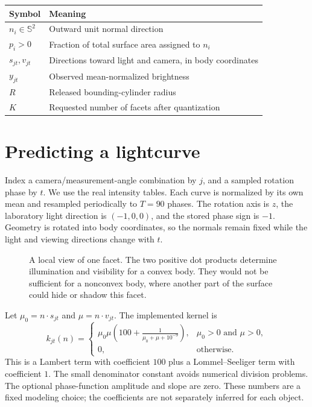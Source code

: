 \documentclass[11pt,a4paper]{article}
\newcommand{\sphere}{\mathbb{S}^{2}}
\begin{document}
\begin{center}
\begin{tabular}{@{}ll@{}}\toprule
Symbol & Meaning \\\midrule
$n_i\in\sphere$ & Outward unit normal direction \\
$p_i>0$ & Fraction of total surface area assigned to $n_i$ \\
$s_{jt},v_{jt}$ & Directions toward light and camera, in body coordinates \\
$y_{jt}$ & Observed mean-normalized brightness \\
$R$ & Released bounding-cylinder radius \\
$K$ & Requested number of facets after quantization \\
\bottomrule\end{tabular}
\end{center}

\clearpage
\section{Predicting a lightcurve}
Index a camera/measurement-angle combination by $j$, and a sampled rotation phase by $t$. We use the real intensity tables. Each curve is normalized by its own mean and resampled periodically to $T=90$ phases. The rotation axis is $z$, the laboratory light direction is $(-1,0,0)$, and the stored phase sign is $-1$. Geometry is rotated into body coordinates, so the normals remain fixed while the light and viewing directions change with $t$.

\begin{figure}[h]
\centering
\caption{A local view of one facet. The two positive dot products determine illumination and visibility for a convex body. They would not be sufficient for a nonconvex body, where another part of the surface could hide or shadow this facet.}
\end{figure}

Let $\mu_{0}=n\cdot s_{jt}$ and $\mu=n\cdot v_{jt}$. The implemented kernel is
\begin{equation}
 k_{jt}(n)=
 \begin{cases}
 \displaystyle \mu_0\mu\left(100+\frac{1}{\mu_0+\mu+10^{-9}}\right),
       &\mu_0>0\text{ and }\mu>0,\\[4pt]
 0, &\text{otherwise}.
 \end{cases}
 \label{eq:kernel}
\end{equation}
This is a Lambert term with coefficient $100$ plus a Lommel--Seeliger term with coefficient $1$. The small denominator constant avoids numerical division problems. The optional phase-function amplitude and slope are zero. These numbers are a fixed modeling choice; the coefficients are not separately inferred for each object.
\end{document}
